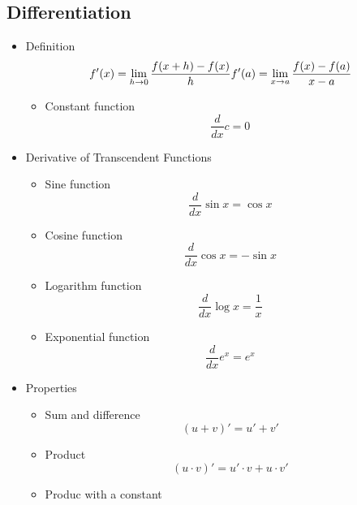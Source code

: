 \subsection{Differentiation}
	\begin{itemize}
		\item Definition
			\begin{equation}
				f'(x)= \lim_{h \rightarrow 0} \frac{f(x+h) - f(x)}{h} \\
				f'(a) = \lim_{x \rightarrow a} \frac{f(x)-f(a)}{x-a}
			\end{equation}
			\begin{itemize}
				\item Constant function
					\begin{equation}
						\dfrac{d}{dx} c = 0
					\end{equation}
			\end{itemize}
		\item Derivative of Transcendent Functions
			\begin{itemize}
				\item Sine function
					\begin{equation}
						\dfrac{d}{dx} \sin x = \cos x
					\end{equation}
				\item Cosine function
					\begin{equation}
						\dfrac{d}{dx} \cos x = - \sin x
					\end{equation}
				\item Logarithm function
					\begin{equation}
						\dfrac{d}{dx} \log x = \frac{1}{x}
					\end{equation}
				\item Exponential function
					\begin{equation}
						\dfrac{d}{dx} e^x = e^x
					\end{equation}
			\end{itemize}
		\item Properties
			\begin{itemize}
				\item Sum and difference
					\begin{equation}
						(u+v)'=u'+v'
					\end{equation}
				\item Product
					\begin{equation}
						(u \cdot v)' = u' \cdot v + u \cdot v'
					\end{equation}
				\item Produc with a constant

\end{itemize}
\end{itemize}
